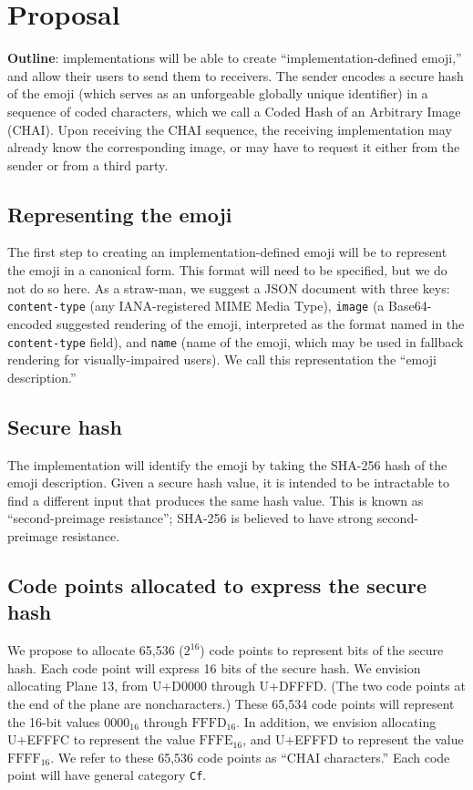 \documentclass[12pt]{article}
\begin{document}
\section{Proposal}

\textbf{Outline}: implementations will be able to create
``implementation-defined emoji,'' and allow their users to send them
to receivers. The sender encodes a secure hash of the emoji (which
serves as an unforgeable globally unique identifier) in a sequence of
coded characters, which we call a Coded Hash of an Arbitrary Image
(CHAI). Upon receiving the CHAI sequence, the receiving implementation
may already know the corresponding image, or may have to request it
either from the sender or from a third party.

\subsection{Representing the emoji}

The first step to creating an implementation-defined emoji will be to
represent the emoji in a canonical form. This format will need to be
specified, but we do not do so here. As a straw-man, we suggest a JSON
document with three keys: \texttt{content-type} (any IANA-registered MIME
Media Type), \texttt{image} (a Base64-encoded suggested rendering of the emoji,
interpreted as the format named in the \texttt{content-type} field), and
\texttt{name} (name of the emoji, which may be used in fallback
rendering for visually-impaired users). We call this representation
the ``emoji description.''

\subsection{Secure hash}

The implementation will identify the emoji by taking the SHA-256 hash
of the emoji description. Given a secure hash value, it is intended to be
intractable to find a different input that produces the same
hash value. This is known as ``second-preimage resistance'';
SHA-256 is believed to have strong second-preimage resistance.

\subsection{Code points allocated to express the secure hash}

We propose to allocate 65,536 ($2^{16}$) code points to represent bits
of the secure hash. Each code point will express 16 bits of the secure
hash. We envision allocating Plane 13, from U+D0000 through
U+DFFFD. (The two code points at the end of the plane are
noncharacters.) These 65,534 code points will represent the 16-bit
values $\mathrm{0000}_{16}$ through $\mathrm{FFFD}_{16}$. In addition,
we envision allocating U+EFFFC to represent the value
$\mathrm{FFFE}_{16}$, and U+EFFFD to represent the value
$\mathrm{FFFF}_{16}$. We refer to these 65,536 code points as ``CHAI
characters.'' Each code point will have general category \texttt{Cf}.
\end{document}

